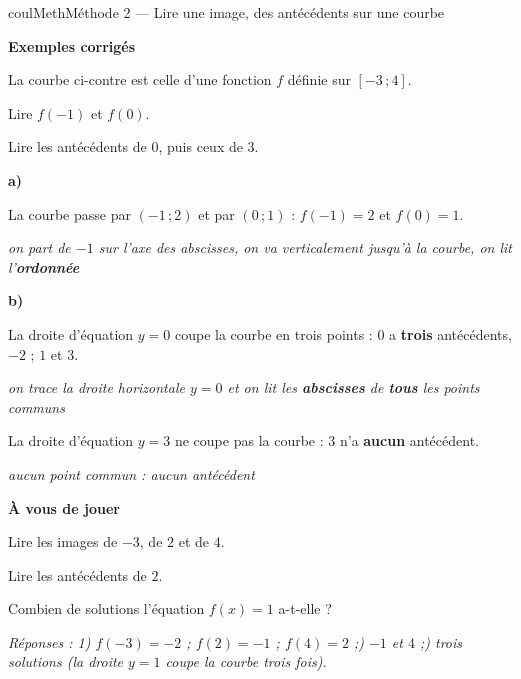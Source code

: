 \documentclass[11pt,a4paper]{article}
\makeatletter
\newcommand{\lycee@repere}[4]{%
  \draw[grille,step=1] (#1,#2) grid (#3,#4);
  \draw[-{Stealth[length=2mm]},thick] (#1,0)--({#3+0.4},0) node[below left=-1pt]{$x$};
  \draw[-{Stealth[length=2mm]},thick] (0,#2)--(0,{#4+0.4}) node[below left=-1pt]{$y$};
  \node[below left,font=\scriptsize,inner sep=1.5pt] at (0,0) {$0$};}
\newcommand{\lycee@gradx}[1]{\foreach \k/\l in {#1}{%
  \draw (\k,0.07)--(\k,-0.07) node[below,font=\scriptsize,inner sep=1.5pt]{$\l$};}}
\newcommand{\lycee@grady}[1]{\foreach \k/\l in {#1}{%
  \draw (0.07,\k)--(-0.07,\k) node[left,font=\scriptsize,inner sep=1.5pt]{$\l$};}}
\newcommand{\lycee@intff}[2]{\left[#1\,;#2\right]}
\providecommand{\repere}{\lycee@repere}%
\providecommand{\gradx}{\lycee@gradx}%
\providecommand{\grady}{\lycee@grady}%
\providecommand{\Cf}{\mathcal{C}\sb{f}}%
\providecommand{\intff}{\lycee@intff}%
\newcounter{lycee@signet}
\newcommand{\signet}[3][]{\stepcounter{lycee@signet}%
  \edef\lycee@dest{\if\relax\detokenize{#1}\relax
    signet.\arabic{lycee@signet}\else#1\fi}%
  \hypertarget{\lycee@dest}{}\bookmark[level=#2,dest=\lycee@dest]{#3}}
\newcommand{\res}[1]{#1}
\newcounter{methode}
\newenvironment{methodebox}[1][Méthode]{\stepcounter{methode}%
  \begin{boitecours}[phantom={\signet[methode-\arabic{methode}]{2}{#1}}]{coulMeth}{#1}}%
  {\end{boitecours}}
\newcommand{\etape}[1]{\par\smallskip\textbf{\color{coulMeth}#1}\par\nobreak\smallskip}
\newcommand{\reponse}[1]{\par\smallskip
  {\footnotesize\itshape\color{black!55}Réponses : #1}}
\newcommand{\explique}[2]{\par\smallskip\noindent
  \begin{minipage}[t]{0.57\linewidth}\raggedright #1\end{minipage}\hfill
  \begin{minipage}[t]{0.40\linewidth}\raggedright\leavevmode
    {\small\itshape\color{black!60}#2}\end{minipage}\par}
\newcommand{\cas}[1]{\par\smallskip\noindent\textbf{\color{coulExo}#1}\vadjust{\nobreak}}
\newenvironment{correction}{\par}{\par}
\newcommand{\etapeexemples}{\etape{Exemples corrigés}}
\makeatother
\begin{document}
\begin{methodebox}[Méthode 2 --- Lire une image, des antécédents sur une courbe]
\etapeexemples
\begin{minipage}[t]{0.58\linewidth}\raggedright
\vspace{0pt}
La courbe ci-contre est celle d'une fonction $f$ définie sur $\intff{-3}{4}$.
\begin{questions}[label=\alph*)]
  \item Lire $f(-1)$ et $f(0)$.
  \item Lire les antécédents de $0$, puis ceux de $3$.
\end{questions}
\end{minipage}\hfill
\begin{minipage}[t]{0.38\linewidth}\centering
\vspace{0pt}
\end{minipage}

\begin{correction}
\cas{a)}
\explique{La courbe passe par $(-1\,;2)$ et par $(0\,;1)$ : $f(-1)=\res{2}$ et $f(0)=\res{1}$.}{on
part de $-1$ sur l'axe des abscisses, on va verticalement jusqu'à la courbe, on lit
l'\textbf{ordonnée}}
\cas{b)}
\explique{La droite d'équation $y=0$ coupe la courbe en trois points : $0$ a
\textbf{trois} antécédents, \res{$-2$ ; $1$ et $3$}.}{on trace la droite horizontale $y=0$ et
on lit les \textbf{abscisses} de \textbf{tous} les points communs}
\explique{La droite d'équation $y=3$ ne coupe pas la courbe : $3$ n'a \res{\textbf{aucun}
antécédent}.}{aucun point commun : aucun antécédent}
\end{correction}

\etape{À vous de jouer}
\begin{questions}
  \item Lire les images de $-3$, de $2$ et de $4$.
  \item Lire les antécédents de $2$.
  \item Combien de solutions l'équation $f(x)=1$ a-t-elle ?
\end{questions}
\reponse{1\textdegree) $f(-3)=-2$ ;\; $f(2)=-1$ ;\; $f(4)=2$ ;\; 2\textdegree) $-1$ et
$4$ ;\; 3\textdegree) trois solutions (la droite $y=1$ coupe la courbe trois fois).}
\end{methodebox}
\end{document}
